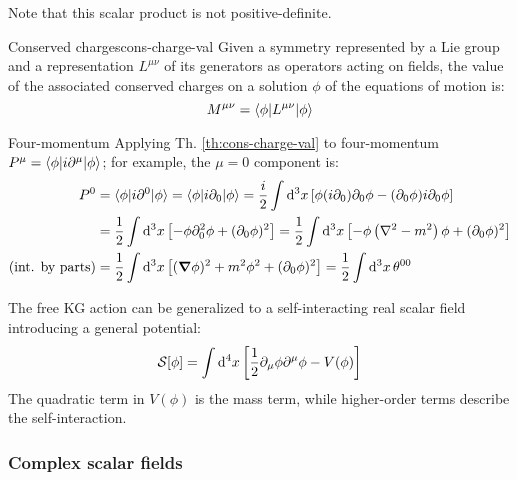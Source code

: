 Note that this scalar product is not positive-definite.

\begin{theorem}{Conserved charges}{cons-charge-val}
  Given a symmetry represented by a Lie group and a representation $ L^{\mu \nu} $ of its generators as operators acting on fields, the value of the associated conserved charges on a solution $ \phi $ of the equations of motion is:
  \begin{equation}
    M^{\mu \nu} = \braket{\phi | L^{\mu \nu} | \phi}
  \end{equation}
\end{theorem}

\begin{example}{Four-momentum}{}
  Applying Th. \ref{th:cons-charge-val} to four-momentum $ P^\mu = \braket{\phi | i \partial^\mu | \phi} $; for example, the $ \mu = 0 $ component is:
  \begin{equation*}
    \begin{split}
      P^0 &= \braket{\phi | i \partial^0 | \phi} = \braket{\phi | i \partial_0 | \phi} = \frac{i}{2} \int \mathrm{d}^3 x \left[ \phi (i \partial_0) \partial_0 \phi - (\partial_0 \phi) i \partial_0 \phi \right] \\
          &= \frac{1}{2} \int \mathrm{d}^3 x \left[ - \phi \partial_0^2 \phi + (\partial_0 \phi)^2 \right] = \frac{1}{2} \int \mathrm{d}^3 x \left[ - \phi \left( \nabla^2 - m^2 \right) \phi + (\partial_0 \phi)^2 \right] \\
      (\text{int. by parts}) &= \frac{1}{2} \int \mathrm{d}^3 x \left[ (\boldsymbol{\nabla} \phi)^2 + m^2 \phi^2 + (\partial_0 \phi)^2 \right] = \frac{1}{2} \int \mathrm{d}^3 x\, \theta^{00}
    \end{split}
  \end{equation*}
\end{example}

The free KG action can be generalized to a self-interacting real scalar field introducing a general potential:
\begin{equation}
  \mathcal{S}[\phi] = \int \mathrm{d}^4 x \left[ \frac{1}{2} \partial_\mu \phi \partial^\mu \phi - V(\phi) \right]
\end{equation}
The quadratic term in $ V(\phi) $ is the mass term, while higher-order terms describe the self-interaction.

\subsubsection{Complex scalar fields}

